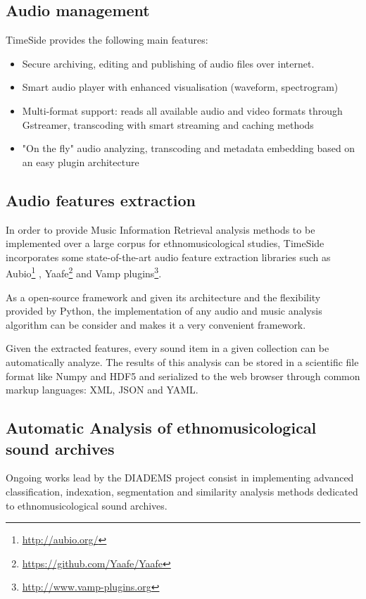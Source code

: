 \documentclass{paper}
\begin{document}
\subsection{Audio management}
TimeSide provides the following main features:
\begin{itemize}
\item Secure archiving, editing and publishing of audio files over
  internet.
\item Smart audio player with enhanced visualisation (waveform, spectrogram)
\item Multi-format support: reads all available audio and video formats  through Gstreamer, transcoding with smart streaming and caching methods%
\item "On the fly" audio analyzing, transcoding and metadata
    embedding based on an easy plugin architecture
\end{itemize}

\subsection{Audio features extraction}
In order to provide Music Information Retrieval analysis methods to be implemented over a large corpus for ethnomusicological studies, TimeSide incorporates some state-of-the-art audio feature extraction libraries such as Aubio\footnote{\url{http://aubio.org/}} \citep{brossierPhD}, Yaafe\footnote{\url{https://github.com/Yaafe/Yaafe}} \citep{yaafe_ISMIR2010} and Vamp plugins\footnote{ \url{http://www.vamp-plugins.org}}.

As a open-source framework and given its architecture and the flexibility provided by Python, the implementation of any audio and music analysis algorithm can be consider and makes it a very convenient framework.

Given the extracted features, every sound item in a given collection can be automatically analyze. The results of this analysis can be stored in a scientific file format like Numpy and HDF5 and serialized to the web browser through common markup languages: XML, JSON and YAML.


\subsection{Automatic Analysis of ethnomusicological sound archives}
Ongoing works lead by the DIADEMS project consist in implementing advanced classification, indexation, segmentation and  similarity analysis methods dedicated to ethnomusicological sound archives.
\end{document}
